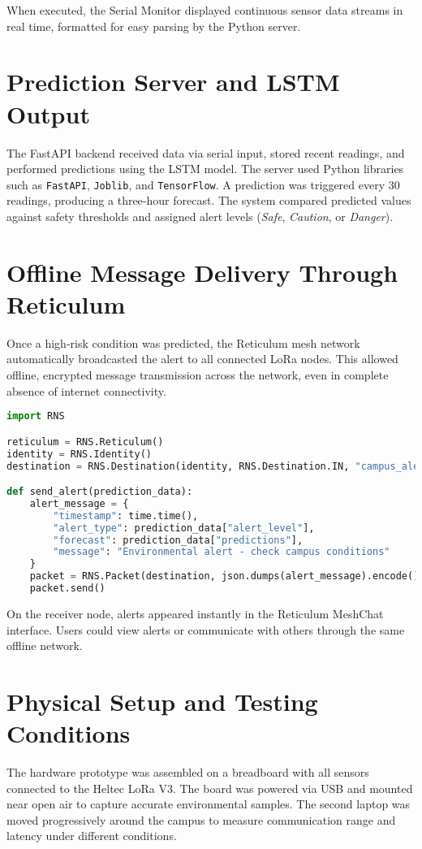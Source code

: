 When executed, the Serial Monitor displayed continuous sensor data streams in real time, formatted for easy parsing by the Python server.

\section{Prediction Server and LSTM Output}
The FastAPI backend received data via serial input, stored recent readings, and performed predictions using the LSTM model. The server used Python libraries such as \texttt{FastAPI}, \texttt{Joblib}, and \texttt{TensorFlow}. A prediction was triggered every 30 readings, producing a three-hour forecast. The system compared predicted values against safety thresholds and assigned alert levels (\textit{Safe}, \textit{Caution}, or \textit{Danger}).

\section{Offline Message Delivery Through Reticulum}
Once a high-risk condition was predicted, the Reticulum mesh network automatically broadcasted the alert to all connected LoRa nodes. This allowed offline, encrypted message transmission across the network, even in complete absence of internet connectivity.

\begin{lstlisting}[language=Python, caption={Sending alerts through Reticulum mesh network}]
import RNS

reticulum = RNS.Reticulum()
identity = RNS.Identity()
destination = RNS.Destination(identity, RNS.Destination.IN, "campus_alerts")

def send_alert(prediction_data):
    alert_message = {
        "timestamp": time.time(),
        "alert_type": prediction_data["alert_level"],
        "forecast": prediction_data["predictions"],
        "message": "Environmental alert - check campus conditions"
    }
    packet = RNS.Packet(destination, json.dumps(alert_message).encode())
    packet.send()
\end{lstlisting}

On the receiver node, alerts appeared instantly in the Reticulum MeshChat interface. Users could view alerts or communicate with others through the same offline network.

\section{Physical Setup and Testing Conditions}
The hardware prototype was assembled on a breadboard with all sensors connected to the Heltec LoRa V3. The board was powered via USB and mounted near open air to capture accurate environmental samples. The second laptop was moved progressively around the campus to measure communication range and latency under different conditions.

